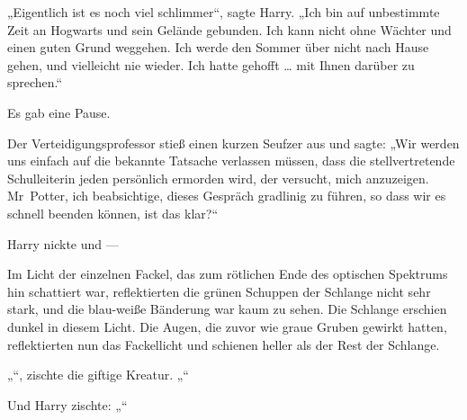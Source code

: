 „Eigentlich ist es noch viel schlimmer“, sagte Harry.
„Ich bin auf unbestimmte Zeit an Hogwarts und sein Gelände gebunden. Ich kann nicht ohne Wächter und einen guten Grund weggehen. Ich werde den Sommer über nicht nach Hause gehen, und vielleicht nie wieder. Ich hatte gehofft … mit Ihnen darüber zu sprechen.“

Es gab eine Pause.

Der Verteidigungsprofessor stieß einen kurzen Seufzer aus und sagte:
„Wir werden uns einfach auf die bekannte Tatsache verlassen müssen, dass die stellvertretende Schulleiterin jeden persönlich ermorden wird, der versucht, mich anzuzeigen. Mr~Potter, ich beabsichtige, dieses Gespräch gradlinig zu führen, so dass wir es schnell beenden können, ist das klar?“

Harry nickte und —

Im Licht der einzelnen Fackel, das zum rötlichen Ende des optischen Spektrums hin schattiert war, reflektierten die grünen Schuppen der Schlange nicht sehr stark, und die blau-weiße Bänderung war kaum zu sehen. Die Schlange erschien dunkel in diesem Licht. Die Augen, die zuvor wie graue Gruben gewirkt hatten, reflektierten nun das Fackellicht und schienen heller als der Rest der Schlange.

„“, zischte die giftige Kreatur. „“

Und Harry zischte: „“

